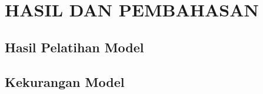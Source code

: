 \chapter{HASIL DAN PEMBAHASAN} \label{cha:4-HasilDanPembahasan}

\section{Hasil Pelatihan Model} \label{sec:4-PersiapanPengujian}

\section{Kekurangan Model} \label{sec:4-PersiapanPengujian}
